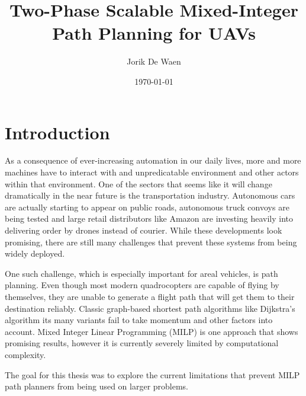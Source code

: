 \documentclass[12pt]{article}
\title{Two-Phase Scalable Mixed-Integer Path Planning for UAVs}
\author{Jorik De Waen}
\date{\today}
\begin{document}
\maketitle

\section{Introduction}
As a consequence of ever-increasing automation in our daily lives, more and more machines have to interact with and unpredicatable environment and other actors within that environment. One of the sectors that seems like it will change dramatically in the near future is the transportation industry. Autonomous cars are actually starting to appear on public roads, autonomous truck convoys are being tested and large retail distributors like Amazon are investing heavily into delivering order by drones instead of courier. While these developments look promising, there are still many challenges that prevent these systems from being widely deployed.

One such challenge, which is especially important for areal vehicles, is path planning. Even though most modern quadrocopters are capable of flying by themselves, they are unable to generate a flight path that will get them to their destination reliably. Classic graph-based shortest path algorithms like Dijkstra's algorithm its many variants fail to take momentum and other factors into account. Mixed Integer Linear Programming (MILP) is one approach that shows promising results, however it is currently severely limited by computational complexity.

The goal for this thesis was to explore the current limitations that prevent MILP path planners from being used on larger problems.



\end{document}
